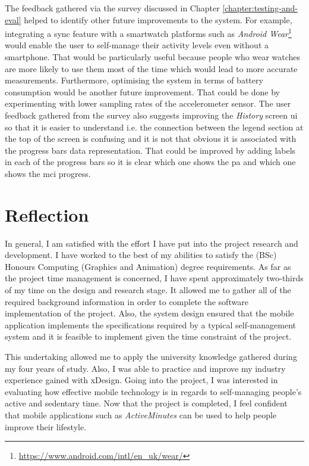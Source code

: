 The feedback gathered via the survey discussed in Chapter \ref{chapter:testing-and-eval} helped to identify other future improvements to the system. For example, integrating a sync feature with a smartwatch platforms such as \textit{Android Wear}\footnote{\url{https://www.android.com/intl/en_uk/wear/}} would enable the user to self-manage their activity levels even without a smartphone. That would be particularly useful because people who wear watches are more likely to use them most of the time which would lead to more accurate measurements. Furthermore, optimising the system in terms of battery consumption would be another future improvement. That could be done by experimenting with lower sampling rates of the accelerometer sensor. The user feedback gathered from the survey also suggests improving the \textit{History} screen \gls{ui} so that it is easier to understand i.e. the connection between the legend section at the top of the screen is confusing and it is not that obvious it is associated with the progress bars data representation. That could be improved by adding labels in each of the progress bars so it is clear which one shows the \gls{pa} and which one shows the \gls{mci} progress.

\section{Reflection}
In general, I am satisfied with the effort I have put into the project research and development. I have worked to the best of my abilities to satisfy the (BSc) Honours Computing (Graphics and Animation) degree requirements. As far as the project time management is concerned, I have spent approximately two-thirds of my time on the design and research stage. It allowed me to gather all of the required background information in order to complete the software implementation of the project. Also, the system design ensured that the mobile application implements the specifications required by a typical self-management system and it is feasible to implement given the time constraint of the project.

This undertaking allowed me to apply the university knowledge gathered during my four years of study. Also, I was able to practice and improve my industry experience gained with xDesign. Going into the project, I was interested in evaluating how effective mobile technology is in regards to self-managing people's active and sedentary time. Now that the project is completed, I feel confident that mobile applications such as \textit{ActiveMinutes} can be used to help people improve their lifestyle.

